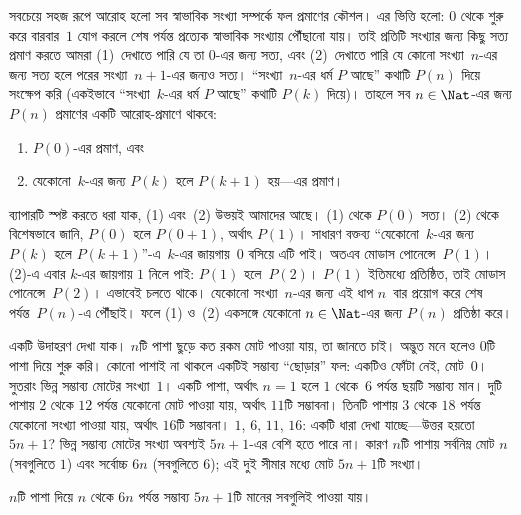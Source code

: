 \documentclass[../../../include/open-logic-section]{subfiles}
\begin{document}


সবচেয়ে সহজ রূপে আরোহ হলো সব স্বাভাবিক সংখ্যা সম্পর্কে
ফল প্রমাণের কৌশল। এর ভিত্তি হলো: $0$ থেকে শুরু করে
বারবার~$1$ যোগ করলে শেষ পর্যন্ত প্রত্যেক স্বাভাবিক সংখ্যায়
পৌঁছানো যায়। তাই প্রতিটি সংখ্যার জন্য কিছু সত্য প্রমাণ করতে
আমরা (1)~দেখাতে পারি যে তা $0$-এর জন্য সত্য, এবং
(2)~দেখাতে পারি যে কোনো সংখ্যা~$n$-এর জন্য সত্য হলে
পরের সংখ্যা~$n+1$-এর জন্যও সত্য। ``সংখ্যা~$n$-এর ধর্ম
$P$ আছে'' কথাটি $P(n)$ দিয়ে সংক্ষেপ করি (একইভাবে
``সংখ্যা~$k$-এর ধর্ম $P$ আছে'' কথাটি $P(k)$ দিয়ে)।
তাহলে সব $n \in \Nat$-এর জন্য $P(n)$ প্রমাণের একটি
আরোহ-প্রমাণে থাকবে:
\begin{enumerate}
\item $P(0)$-এর প্রমাণ, এবং
\item যেকোনো~$k$-এর জন্য $P(k)$ হলে $P(k+1)$ হয়—এর প্রমাণ।
\end{enumerate}
ব্যাপারটি স্পষ্ট করতে ধরা যাক, (1) এবং~(2) উভয়ই আমাদের
আছে। (1) থেকে $P(0)$ সত্য। (2) থেকে বিশেষভাবে জানি,
$P(0)$ হলে $P(0+1)$, অর্থাৎ $P(1)$। সাধারণ বক্তব্য
``যেকোনো~$k$-এর জন্য $P(k)$ হলে $P(k+1)$''-এ~$k$-এর
জায়গায়~$0$ বসিয়ে এটি পাই। অতএব মোডাস পোনেন্সে~$P(1)$।
(2)-এ এবার $k$-এর জায়গায় $1$ নিলে পাই: $P(1)$ হলে~$P(2)$।
$P(1)$ ইতিমধ্যে প্রতিষ্ঠিত, তাই মোডাস পোনেন্সে~$P(2)$।
এভাবেই চলতে থাকে। যেকোনো সংখ্যা~$n$-এর জন্য এই ধাপ
$n$~বার প্রয়োগ করে শেষ পর্যন্ত~$P(n)$-এ পৌঁছাই। ফলে
(1) ও~(2) একসঙ্গে যেকোনো $n \in \Nat$-এর জন্য $P(n)$
প্রতিষ্ঠা করে।

একটি উদাহরণ দেখা যাক। $n$টি পাশা ছুড়ে কত রকম মোট
পাওয়া যায়, তা জানতে চাই। অদ্ভুত মনে হলেও $0$টি পাশা
দিয়ে শুরু করি। কোনো পাশাই না থাকলে একটিই সম্ভাব্য
``ছোড়ার'' ফল: একটিও ফোঁটা নেই, মোট~$0$। সুতরাং ভিন্ন
সম্ভাব্য মোটের সংখ্যা~$1$। একটি পাশা, অর্থাৎ $n=1$ হলে
$1$ থেকে~$6$ পর্যন্ত ছয়টি সম্ভাব্য মান। দুটি পাশায় $2$
থেকে $12$ পর্যন্ত যেকোনো মোট পাওয়া যায়, অর্থাৎ $11$টি
সম্ভাবনা। তিনটি পাশায় $3$ থেকে $18$ পর্যন্ত যেকোনো সংখ্যা
পাওয়া যায়, অর্থাৎ $16$টি সম্ভাবনা। $1$, $6$, $11$, $16$:
একটি ধারা দেখা যাচ্ছে—উত্তর হয়তো $5n+1$? ভিন্ন সম্ভাব্য
মোটের সংখ্যা অবশ্যই $5n+1$-এর বেশি হতে পারে না। কারণ $n$টি পাশায়
সর্বনিম্ন মোট $n$ (সবগুলিতে $1$) এবং সর্বোচ্চ $6n$
(সবগুলিতে $6$); এই দুই সীমার মধ্যে মোট $5n+1$টি সংখ্যা।

\begin{thm}
  $n$টি পাশা দিয়ে $n$ থেকে $6n$ পর্যন্ত সম্ভাব্য $5n+1$টি
  মানের সবগুলিই পাওয়া যায়।
\end{thm}
\end{document}
